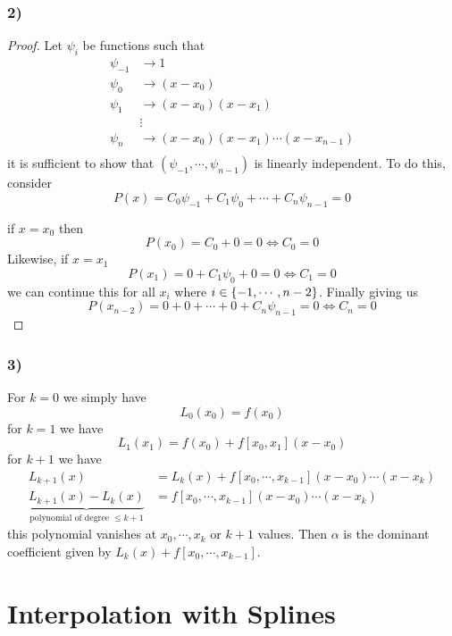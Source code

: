 \subsubsection{2)}
\begin{proof}
Let $ \psi_i  $ be functions such that 
\begin{align*}
    \psi_{-1} &\to 1  \\ 
    \psi_0 &\to (x-x_0)  \\ 
    \psi_1 &\to (x-x_0)(x-x_1)  \\ 
           &\vdots \\
    \psi_n &\to (x-x_0)(x-x_1)\cdots\left( x-x_{n-1}\right)   \\ 
\end{align*}
it is sufficient to show that $ \left( \psi_{-1}, \cdots, \psi_{n-1} \right)  $ is
linearly independent.
To do this, consider 
\[
    P(x) = C_0\psi_{-1} + C_1\psi_{0} + \cdots + C_n\psi_{n-1} = 0
\]

if $ x = x_0 $ then 
\[
    P(x_0) = C_0 + 0 = 0 \iff C_0 = 0
\]
Likewise, if $ x = x_1 $
\[
    P(x_1) = 0 + C_1\psi_0  + 0 = 0 \iff C_1 = 0
\]
we can continue this for all $ x_i$ where $ i \in \set{ -1, \cdots, n-2 }  $. Finally
giving us 
\[
    P(x_{n-2}) = 0 + 0 + \cdots + 0 + C_n\psi_{n-1} = 0 \iff C_n = 0
\] 
\end{proof}

\subsubsection{3)}
For $ k=0 $ we simply have 
\[
    L_0(x_0) = f(x_0)  
\]
for $ k=1 $ we have 
\[
    L_1(x_1) = f(x_0) + f[x_0, x_1](x-x_0)  
\]
for $ k + 1 $ we have 
\begin{align*}
    L_{k+1} (x) &= L_k(x) + f[x_0, \cdots, x_{k-1} ] \left( x-x_0\right) \cdots\left(
    x-x_k\right) \\
        \underbrace{ L_{k+1}(x) - L_k(x)}_{\text{polynomial of degree } \leq k+1 } &= f[x_0, \cdots, x_{k-1} ] \left( x-x_0\right) \cdots\left( x-x_k\right)
\end{align*}
this polynomial vanishes at $ x_0, \cdots, x_k $ or $ k+1  $ values. Then $ \alpha  $ is
the dominant coefficient given by $ L_k(x) + f[x_0, \cdots, x_{k-1} ] $.  

\section{Interpolation with Splines}
\label{sec:Interpolation with Splines}

